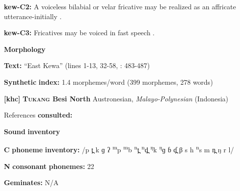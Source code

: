\begin{styleBody}
\textbf{kew-C2:} A voiceless bilabial or velar fricative may be realized as an affricate utterance-initially \citep[24]{Franklin1971}.
\end{styleBody}

\begin{styleBody}
\textbf{kew-C3:} Fricatives may be voiced in fast speech \citep[24]{Franklin1971}.
\end{styleBody}

\begin{styleBody}
\textbf{Morphology}
\end{styleBody}

\begin{styleBody}
\textbf{Text:} “East Kewa” (lines 1-13, 32-58, \citealt{FranklinFranklin1978}: 483-487)
\end{styleBody}

\begin{styleBody}
\textbf{Synthetic} \textbf{index:} 1.4 morphemes/word (399 morphemes, 278 words)
\end{styleBody}

\begin{styleBody}
\textbf{[khc]}   \textbf{\textsc{Tukang} \textbf{Besi} \textbf{North}}  Austronesian, \textit{Malayo-Polynesian} (Indonesia)
\end{styleBody}

\begin{styleBody}
References \textbf{consulted:} \citet{Donohue1999}
\end{styleBody}

\begin{styleBody}
\textbf{Sound} \textbf{inventory}
\end{styleBody}

\begin{styleBody}
\textbf{C} \textbf{phoneme} \textbf{inventory:} /p t̪ k ɡ ʔ \textsuperscript{m}p \textsuperscript{m}b \textsuperscript{n}t̪ \textsuperscript{n}d̪ \textsuperscript{ŋ}k \textsuperscript{ŋ}ɡ ɓ ɗ̪ β s h \textsuperscript{n}s m n̪ ŋ r l/
\end{styleBody}

\begin{styleBody}
\textbf{N} \textbf{consonant} \textbf{phonemes:} 22
\end{styleBody}

\begin{styleBody}
\textbf{Geminates:} N/A
\end{styleBody}

